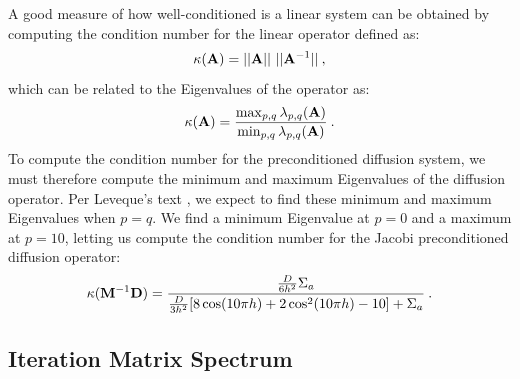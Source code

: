\documentclass{mc2013}
\begin{document}
A good measure of how well-conditioned is a linear system can be
obtained by computing the condition number for the linear operator
defined as:
\begin{equation}
  \kappa(\ve{A}) = ||\ve{A}||\ ||\ve{A}^{-1}||\:,
  \label{eq:condition_number}
\end{equation}
which can be related to the Eigenvalues of the operator as:
\begin{equation}
  \kappa(\mathbf{A}) =
  \frac{\max_{p,q}\lambda_{p,q}(\mathbf{A})}{\min_{p,q}\lambda_{p,q}(\mathbf{A})}\:.
  \label{eq:condition_number_2}
\end{equation}
To compute the condition number for the preconditioned diffusion
system, we must therefore compute the minimum and maximum Eigenvalues
of the diffusion operator. Per Leveque's text
\cite{leveque_finite_2007}, we expect to find these minimum and
maximum Eigenvalues when $p=q$. We find a minimum Eigenvalue at $p=0$
and a maximum at $p=10$, letting us compute the condition number for
the Jacobi preconditioned diffusion operator:
\begin{equation}
  \kappa(\mathbf{M}^{-1} \mathbf{D}) =
  \frac{\frac{D}{6h^2}\Sigma_a}{\frac{D}{3h^2}[8 \cos(10 \pi h) + 2
      \cos^2(10 \pi h) - 10] + \Sigma_a}\:.
  \label{eq:diffusion_condition}
\end{equation}

\subsection{Iteration Matrix Spectrum}
\label{subsec:iteration_spectrum}
\end{document}
